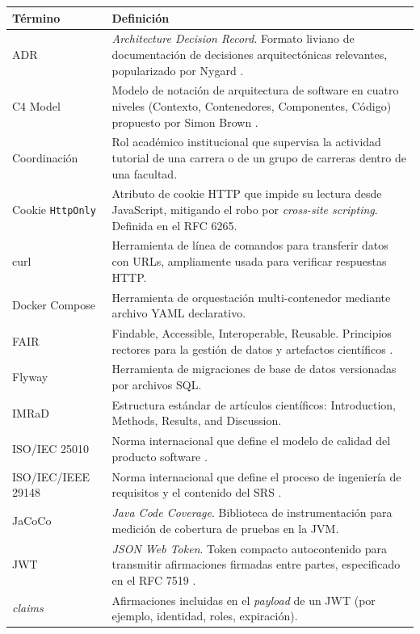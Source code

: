 \documentclass[11pt,a4paper,twoside]{report}
\begin{document}
\begin{longtable}{@{}p{3.2cm}p{11.5cm}@{}}
    \toprule
    \textbf{T\'ermino} & \textbf{Definici\'on} \\
    \midrule
    \endhead
    ADR & \emph{Architecture Decision Record}. Formato liviano de documentaci\'on de decisiones arquitect\'onicas relevantes, popularizado por Nygard \cite{nygard2011adr}. \\
    C4 Model & Modelo de notaci\'on de arquitectura de software en cuatro niveles (Contexto, Contenedores, Componentes, C\'odigo) propuesto por Simon Brown \cite{brown2023c4}. \\
    Coordinaci\'on & Rol acad\'emico institucional que supervisa la actividad tutorial de una carrera o de un grupo de carreras dentro de una facultad. \\
    Cookie \texttt{HttpOnly} & Atributo de cookie HTTP que impide su lectura desde JavaScript, mitigando el robo por \emph{cross-site scripting}. Definida en el RFC 6265. \\
    curl & Herramienta de l\'inea de comandos para transferir datos con URLs, ampliamente usada para verificar respuestas HTTP. \\
    Docker Compose & Herramienta de orquestaci\'on multi-contenedor mediante archivo YAML declarativo. \\
    FAIR & Findable, Accessible, Interoperable, Reusable. Principios rectores para la gesti\'on de datos y artefactos cient\'ificos \cite{wilkinson2016fair}. \\
    Flyway & Herramienta de migraciones de base de datos versionadas por archivos SQL. \\
    IMRaD & Estructura est\'andar de art\'iculos cient\'ificos: Introduction, Methods, Results, and Discussion. \\
    ISO/IEC 25010 & Norma internacional que define el modelo de calidad del producto software \cite{iso25010}. \\
    ISO/IEC/IEEE 29148 & Norma internacional que define el proceso de ingenier\'ia de requisitos y el contenido del SRS \cite{iso29148}. \\
    JaCoCo & \emph{Java Code Coverage}. Biblioteca de instrumentaci\'on para medici\'on de cobertura de pruebas en la JVM. \\
    JWT & \emph{JSON Web Token}. Token compacto autocontenido para transmitir afirmaciones firmadas entre partes, especificado en el RFC 7519 \cite{jones2015jwt}. \\
    \emph{claims} & Afirmaciones incluidas en el \emph{payload} de un JWT (por ejemplo, identidad, roles, expiraci\'on). \\

\end{longtable}
\end{document}
